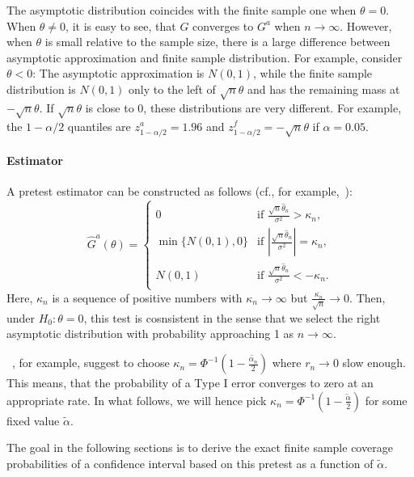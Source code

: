 \documentclass[12pt,a4paper,english]{article} %
\numberwithin{equation}{section}
\theoremstyle{definition}
\theoremstyle{remark}
\theoremstyle{plain}
\begin{document}
The asymptotic distribution coincides with the finite sample one when $\theta=0$.
When $\theta\neq0$, it is easy to see, that $G$ converges to $G^a$ when $n\to\infty$.
However, when $\theta$ is small relative to the sample size, there is a large difference between asymptotic approximation and finite sample distribution.
For example, consider $\theta < 0$: The asymptotic approximation is $N(0,1)$, while the finite sample distribution is $N(0,1)$ only to the left of $\sqrt{n}\theta$ and has the remaining mass at $-\sqrt{n}\theta$.
If $\sqrt{n}\theta$ is close to $0$, these distributions are very different.
For example, the $1-\alpha/2$ quantiles are $z^a_{1-\alpha/2} = 1.96$ and $z^f_{1-\alpha/2} = -\sqrt{n}\theta$ if $\alpha=0.05$.

\paragraph{Estimator}
A pretest estimator can be constructed as follows (cf., for example,~\cite{fang2019infdirdiff}):
\begin{equation}
  \hat{G}^a(\theta)=
    \begin{cases}
      0 & \text{if } \frac{\sqrt{n}\hat{\theta}_n}{\sigma^2} > \kappa_n,\\
      \min\{N(0,1), 0\}& \text{if } |\frac{\sqrt{n}\hat{\theta}_n}{\sigma^2}| = \kappa_n,\\
      N(0,1)& \text{if } \frac{\sqrt{n}\hat{\theta}_n}{\sigma^2} < - \kappa_n.\\
  \end{cases}
\end{equation}
Here, $\kappa_n$ is a sequence of positive numbers with $\kappa_n \to \infty$ but $\frac{\kappa_n}{\sqrt{n}} \to 0$.
Then, under $H_0: \theta = 0$, this test is cosnsistent in the sense that we select the right asymptotic distribution with probability approaching 1 as $n\to\infty$.

~\cite{fang2019infdirdiff}, for example, suggest to choose $\kappa_n = \Phi^{-1}(1-\frac{\tilde{\alpha_n}}{2})$ where $r_n\to 0$ slow enough.
This means, that the probability of a Type I error converges to zero at an appropriate rate.
In what follows, we will hence pick $\kappa_n = \Phi^{-1}(1-\frac{\tilde{\alpha}}{2})$ for some fixed value $\tilde{\alpha}$.

The goal in the following sections is to derive the exact finite sample coverage probabilities of a confidence interval based on this pretest as a function of $\tilde{\alpha}$.
\end{document}
